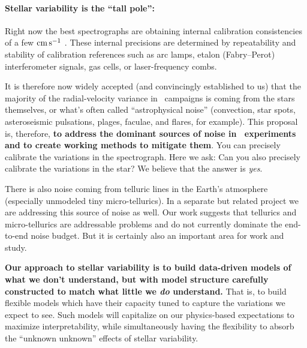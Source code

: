 \documentclass[12pt, letterpaper]{article}
\begin{document}
\paragraph{Stellar variability is the ``tall pole'':}
Right now the best spectrographs are obtaining internal calibration
consistencies of a few ${\mathrm{cm\,s^{-1}}}$ \citep{espresso-eprv4, expres-eprv4}.
These internal precisions are determined by repeatability and
stability of calibration references such as arc lamps, etalon
(Fabry--Perot) interferometer signals, gas cells, or laser-frequency
combs.

It is therefore now widely accepted (and convincingly
established to us) that the majority of the radial-velocity variance
in \EPRV\ campaigns is coming from the stars themselves, or what's
often called ``astrophysical noise'' (convection, star spots,
asteroseismic pulsations, plages, faculae, and flares, for example).
This proposal is, therefore, \textbf{to address the dominant sources of
  noise in \EPRV\ experiments and to create working methods to
  mitigate them}.
You can precisely calibrate the variations in the spectrograph.
Here we ask: Can you also precisely calibrate the variations in the star?
We believe that the answer is \emph{yes}.

There is also noise coming from telluric lines in the Earth's atmosphere
(especially unmodeled tiny micro-tellurics).
In a separate but related project \citep{Bedell2019} we are addressing this
source of noise as well.
Our work suggests that tellurics and micro-tellurics are addressable problems
and do not currently dominate the end-to-end noise budget.
But it is certainly also an important area for work and study.

\textbf{Our approach to stellar variability is to build data-driven models of what
we don't understand, but with model structure carefully constructed to
match what little we \emph{do} understand.}
That is, to build flexible models which have their capacity tuned to
capture the variations we expect to see. 
Such models will capitalize on our physics-based expectations to
maximize interpretability, while simultaneously having the flexibility to absorb 
the ``unknown unknown'' effects of stellar variability.
\end{document}
